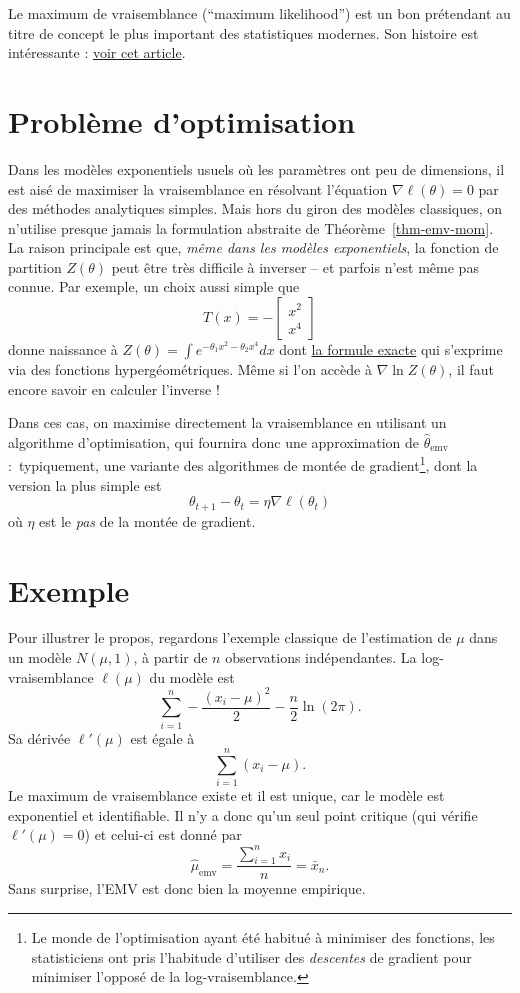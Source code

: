 \documentclass[
  10,
  letterpaper,
  DIV=11,
  numbers=noendperiod]{scrreport}
\newcommand{\emv}{\hat{\theta}_{\mathrm{emv}}}
\theoremstyle{plain}
\theoremstyle{definition}
\theoremstyle{plain}
\theoremstyle{definition}
\theoremstyle{definition}
\theoremstyle{plain}
\theoremstyle{remark}
\begin{document}
Le maximum de vraisemblance (``maximum likelihood'') est un bon
prétendant au titre de concept le plus important des statistiques
modernes. Son histoire est intéressante :
\href{https://arxiv.org/abs/0804.2996}{voir cet article}.

\hypertarget{probluxe8me-doptimisation}{%
\section{Problème d'optimisation}\label{probluxe8me-doptimisation}}

Dans les modèles exponentiels usuels où les paramètres ont peu de
dimensions, il est aisé de maximiser la vraisemblance en résolvant
l'équation \(\nabla \ell(\theta)=0\) par des méthodes analytiques
simples. Mais hors du giron des modèles classiques, on n'utilise presque
jamais la formulation abstraite de Théorème~\ref{thm-emv-mom}. La raison
principale est que, \emph{même dans les modèles exponentiels}, la
fonction de partition \(Z(\theta)\) peut être très difficile à inverser
-- et parfois n'est même pas connue. Par exemple, un choix aussi simple
que \[T(x) = -\begin{bmatrix}x^2 \\ x^4 \end{bmatrix}\] donne naissance
à \(Z(\theta) = \int e^{-\theta_1 x^2 - \theta_2 x^4}dx\) dont
\href{https://math.stackexchange.com/questions/471496/exponential-of-a-quartic}{la
formule exacte} qui s'exprime via des fonctions hypergéométriques. Même
si l'on accède à \(\nabla \ln Z(\theta)\), il faut encore savoir en
calculer l'inverse !

Dans ces cas, on maximise directement la vraisemblance en utilisant un
algorithme d'optimisation, qui fournira donc une approximation de
\(\emv\) :~typiquement, une variante des algorithmes de montée de
gradient\footnote{Le monde de l'optimisation ayant été habitué à
  minimiser des fonctions, les statisticiens ont pris l'habitude
  d'utiliser des \emph{descentes} de gradient pour minimiser l'opposé de
  la log-vraisemblance.}, dont la version la plus simple est
\[ \theta_{t+1} - \theta_t = \eta \nabla \ell(\theta_t)\] où \(\eta\)
est le \emph{pas} de la montée de gradient.

\hypertarget{exemple}{%
\section{Exemple}\label{exemple}}

Pour illustrer le propos, regardons l'exemple classique de l'estimation
de \(\mu\) dans un modèle \(N(\mu, 1)\), à partir de \(n\) observations
indépendantes. La log-vraisemblance \(\ell(\mu)\) du modèle est
\[\sum_{i=1}^n -\frac{(x_i - \mu)^2}{2} - \frac{n}{2}\ln(2\pi).\] Sa
dérivée \(\ell'(\mu)\) est égale à \[ \sum_{i=1}^n (x_i - \mu).\] Le
maximum de vraisemblance existe et il est unique, car le modèle est
exponentiel et identifiable. Il n'y a donc qu'un seul point critique
(qui vérifie \(\ell'(\mu)=0\)) et celui-ci est donné par
\[ \hat{\mu}_{\mathrm{emv}} = \frac{\sum_{i=1}^n x_i}{n} = \bar{x}_n.\]
Sans surprise, l'EMV est donc bien la moyenne empirique.
\end{document}
